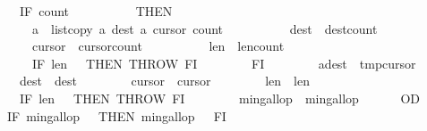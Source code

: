 \begin{isabellebody}
\ \ \ \ \ \ \ \ IF\ {\isasymacute}count{}\ {\isasymnoteq}\ {}\isanewline
\ \ \ \ \ \ \ \ THEN\isanewline
\ \ \ \ \ \ \ \ \ \ {\isasymacute}a\ {\isacharcolon}{\isacharequal}{\isacharequal}\ list{\isacharunderscore}copy\ {\isasymacute}a\ {\isasymacute}dest\ {\isasymacute}a\ {\isasymacute}cursor{}\ {\isasymacute}count{}{\isacharsemicolon}{\isacharsemicolon}\isanewline
\ \ \ \ \ \ \ \ \ \ {\isasymacute}dest\ {\isacharcolon}{\isacharequal}{\isacharequal}\ {\isasymacute}dest{\isacharplus}{\isasymacute}count{}{\isacharsemicolon}{\isacharsemicolon}\isanewline
\ \ \ \ \ \ \ \ \ \ {\isasymacute}cursor{}\ {\isacharcolon}{\isacharequal}{\isacharequal}\ {\isasymacute}cursor{}{\isacharplus}{\isasymacute}count{}{\isacharsemicolon}{\isacharsemicolon}\isanewline
\ \ \ \ \ \ \ \ \ \ {\isasymacute}len{}\ {\isacharcolon}{\isacharequal}{\isacharequal}\ {\isasymacute}len{}{\isacharminus}{\isasymacute}count{}{\isacharsemicolon}{\isacharsemicolon}\isanewline
\ \ \ \ \ \ \ \ \ \ IF\ {\isasymacute}len{}\ {\isacharequal}\ {}\ THEN\ THROW\ FI\isanewline
\ \ \ \ \ \ \ \ FI{\isacharsemicolon}{\isacharsemicolon}\isanewline
\ \ \ \ \ \ \ \ {\isasymacute}a{\isacharbang}{\isasymacute}dest\ {\isacharcolon}{\isacharequal}{\isacharequal}\ {\isasymacute}tmp{\isacharbang}{\isasymacute}cursor{}{\isacharsemicolon}{\isacharsemicolon}\isanewline
\ \ \ \ \ \ \ \ {\isasymacute}dest\ {\isacharcolon}{\isacharequal}{\isacharequal}\ {\isasymacute}dest{\isacharplus}{}{\isacharsemicolon}{\isacharsemicolon}\isanewline
\ \ \ \ \ \ \ \ {\isasymacute}cursor{}\ {\isacharcolon}{\isacharequal}{\isacharequal}\ {\isasymacute}cursor{}{\isacharplus}{}{\isacharsemicolon}{\isacharsemicolon}\isanewline
\ \ \ \ \ \ \ \ {\isasymacute}len{}\ {\isacharcolon}{\isacharequal}{\isacharequal}\ {\isasymacute}len{}{\isacharminus}{}{\isacharsemicolon}{\isacharsemicolon}\isanewline
\ \ \ \ \ \ \ \ IF\ {\isasymacute}len{}\ {\isacharequal}\ {}\ THEN\ THROW\ FI{\isacharsemicolon}{\isacharsemicolon}\isanewline
\ \ \ \ \ \ \ \ {\isasymacute}min{\isacharunderscore}gallop\ {\isacharcolon}{\isacharequal}{\isacharequal}\ {\isasymacute}min{\isacharunderscore}gallop{\isacharminus}{}\isanewline
\ \ \ \ \ \ OD{\isacharsemicolon}{\isacharsemicolon}\isanewline
\ \ \ \ \ \ IF\ {\isasymacute}min{\isacharunderscore}gallop\ {\isacharless}\ {}\ THEN\ {\isasymacute}min{\isacharunderscore}gallop\ {\isacharcolon}{\isacharequal}{\isacharequal}\ {}\ FI{\isacharsemicolon}{\isacharsemicolon}\isanewline

\end{isabellebody}

